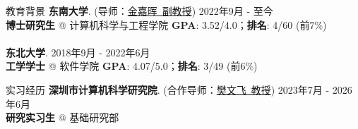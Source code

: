 \documentclass{cv} %
\newcommand{\mei}{\end{myitemize}\vspace{0.6ex}}
\begin{document}
\begin{rSection}[MITRed]{教育背景}
{\textbf{东南大学}. (导师：\href{https://jujuhoo.github.io/}{金嘉晖~副教授})} \hfill {2022年9月 - 至今}
\\ \textbf{博士研究生} @ 计算机科学与工程学院
\hfill { \textbf{GPA}: 3.52/4.0；\textbf{排名}: 4/60 (前7\%)}
\\\\
{\textbf{东北大学}}. \hfill {2018年9月 - 2022年6月}
\\ \textbf{工学学士} @ 软件学院
\hfill { \textbf{GPA}: 4.07/5.0；\textbf{排名}: 3/49 (前6\%)}
\end{rSection}

\begin{rSection}[MITRed]{实习经历}
{\bf 深圳市计算机科学研究院}. (合作导师：\href{https://homepages.inf.ed.ac.uk/wenfei/}{樊文飞~教授}) \hfill {2023年7月 - 2026年6月}\\
{\bf 研究实习生} @ 基础研究部
\end{rSection}


\end{document}
